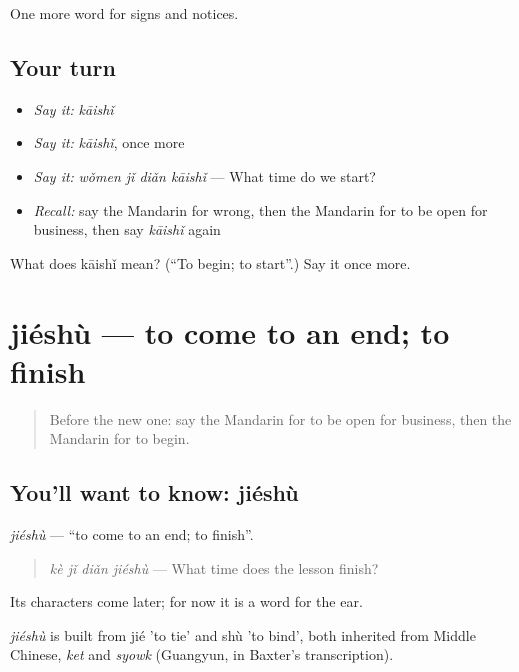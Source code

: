 \begin{grammarlens}[title={What you've built}]
One more word for signs and notices.
\end{grammarlens}

\subsection*{Your turn}
\begin{itemize}
\raggedright
  \item \emph{Say it:} \emph{kāishǐ}
  \item \emph{Say it:} \emph{kāishǐ}, once more
  \item \emph{Say it:} \emph{wǒmen jǐ diǎn kāishǐ} — What time do we start?
  \item \emph{Recall:} say the Mandarin for wrong, then the Mandarin for to be open for business, then say \emph{kāishǐ} again
\end{itemize}

\begin{tcolorbox}[breakable,colback=teal!4,colframe=teal!35!black,title={Before you move on}]
What does kāishǐ mean? (\textquotedblleft{}To begin; to start\textquotedblright{}.) Say it once more.
\end{tcolorbox}
\section[jiéshù]{jiéshù — to come to an end; to finish}

\label{lesson:ZH-C122-jieshu}



\begin{quote}
Before the new one: say the Mandarin for to be open for business, then the Mandarin for to begin.
\end{quote}

\subsection*{You'll want to know: jiéshù}
\emph{jiéshù} — \textquotedblleft{}to come to an end; to finish\textquotedblright{}.

\begin{quote}
\emph{kè jǐ diǎn jiéshù} — What time does the lesson finish?
\end{quote}

Its characters come later; for now it is a word for the ear.

\begin{cousinweb}
\emph{jiéshù} is built from jié 'to tie' and shù 'to bind', both inherited from Middle Chinese, \emph{ket} and \emph{syowk} (Guangyun, in Baxter's transcription).
\end{cousinweb}

